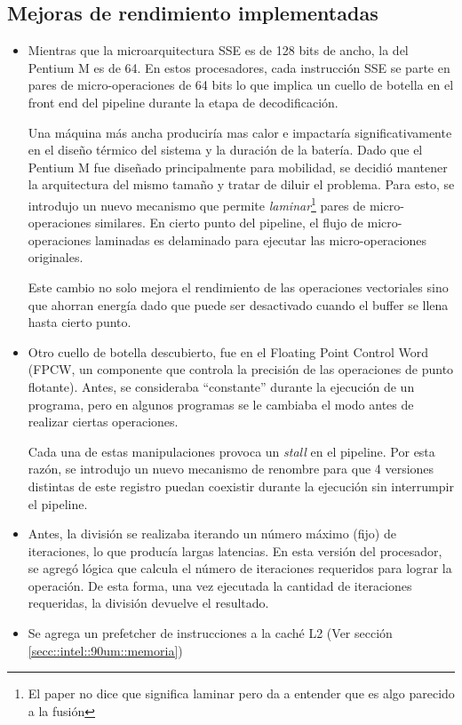 \subsection{Mejoras de rendimiento implementadas}
\begin{itemize}
	\item Mientras que la microarquitectura SSE es de 128 bits de ancho, la del Pentium M es de 64. En estos procesadores, cada instrucción SSE se parte en pares de micro-operaciones de 64 bits lo que implica un cuello de botella en el front end del pipeline durante la etapa de decodificación.  
	
	Una máquina más ancha produciría mas calor e impactaría significativamente en el diseño térmico del sistema y la duración de la batería. Dado que el Pentium M fue diseñado principalmente para mobilidad, se decidió mantener la arquitectura del mismo tamaño y tratar de diluir el problema. Para esto, se introdujo un nuevo mecanismo que permite \textit{laminar}\footnote{El paper no dice que significa laminar pero da a entender que es algo parecido a la fusión} pares de micro-operaciones similares. En cierto punto del pipeline, el flujo de micro-operaciones laminadas es delaminado para ejecutar las micro-operaciones originales. 
	
	Este cambio no solo mejora el rendimiento de las operaciones vectoriales sino que ahorran energía dado que puede ser desactivado cuando el buffer se llena hasta cierto punto.
	
	\item Otro cuello de botella descubierto, fue en el  Floating Point Control Word (FPCW, un componente que controla la precisión de las operaciones de punto flotante). Antes, se consideraba ``constante'' durante la ejecución de un programa, pero en algunos programas se le cambiaba el modo antes de realizar ciertas operaciones. 
	
	Cada una de estas manipulaciones provoca un \textit{stall} en el pipeline. Por esta razón, se introdujo un nuevo mecanismo de renombre para que 4 versiones distintas de este registro puedan coexistir durante la ejecución sin interrumpir el pipeline.
	
	\item Antes, la división se realizaba iterando un número máximo (fijo) de iteraciones, lo que producía largas latencias. En esta versión del procesador, se agregó lógica que calcula el número de iteraciones requeridos para lograr la operación. De esta forma, una vez ejecutada la cantidad de iteraciones requeridas, la división devuelve el resultado.
	
	\item Se agrega un prefetcher de instrucciones a la caché L2 (Ver sección \ref{secc::intel::90um::memoria})

\end{itemize}
